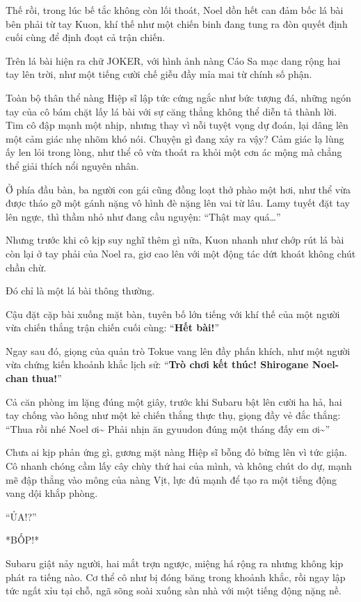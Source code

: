 \documentclass[../main.tex]{subfiles}
\begin{document}
\label{cardleft}

Thế rồi, trong lúc bế tắc không còn lối thoát, Noel dồn hết can đảm bốc lá bài bên phải từ tay Kuon, khí thế như một chiến binh đang tung ra đòn quyết định cuối cùng để định đoạt cả trận chiến.

Trên lá bài hiện ra chữ JOKER, với hình ảnh nàng Cáo Sa mạc dang rộng hai tay lên trời, như một tiếng cười chế giễu đầy mỉa mai từ chính số phận.

Toàn bộ thân thể nàng Hiệp sĩ lập tức cứng ngắc như bức tượng đá, những ngón tay của cô bám chặt lấy lá bài với sự căng thẳng không thể diễn tả thành lời. Tim cô đập mạnh một nhịp, nhưng thay vì nỗi tuyệt vọng dự đoán, lại dâng lên một cảm giác nhẹ nhõm khó nói. Chuyện gì đang xảy ra vậy? Cảm giác lạ lùng ấy len lỏi trong lòng, như thể cô vừa thoát ra khỏi một cơn ác mộng mà chẳng thể giải thích nổi nguyên nhân.

Ở phía đầu bàn, ba người con gái cũng đồng loạt thở phào một hơi, như thể vừa được tháo gỡ một gánh nặng vô hình đè nặng lên vai từ lâu. Lamy tuyết đặt tay lên ngực, thì thầm nhỏ như đang cầu nguyện: ``Thật may quá\dots''

Nhưng trước khi cô kịp suy nghĩ thêm gì nữa, Kuon nhanh như chớp rút lá bài còn lại ở tay phải của Noel ra, giơ cao lên với một động tác dứt khoát không chút chần chừ.

Đó chỉ là một lá bài thông thường.

Cậu đặt cặp bài xuống mặt bàn, tuyên bố lớn tiếng với khí thế của một người vừa chiến thắng trận chiến cuối cùng: ``\textbf{Hết bài!}''

Ngay sau đó, giọng của quản trò Tokue vang lên đầy phấn khích, như một người vừa chứng kiến khoảnh khắc lịch sử: ``\textbf{Trò chơi kết thúc! Shirogane Noel-chan thua!}''

Cả căn phòng im lặng đúng một giây, trước khi Subaru bật lên cười ha hả, hai tay chống vào hông như một kẻ chiến thắng thực thụ, giọng đầy vẻ đắc thắng: ``Thua rồi nhé Noel ơi\~{} Phải nhịn ăn gyuudon đúng một tháng đấy em ơi\~{}''

Chưa ai kịp phản ứng gì, gương mặt nàng Hiệp sĩ bỗng đỏ bừng lên vì tức giận. Cô nhanh chóng cầm lấy cây chùy thứ hai của mình, và không chút do dự, mạnh mẽ đập thẳng vào mông của nàng Vịt, lực đủ mạnh để tạo ra một tiếng động vang dội khắp phòng.

``ỦA!?''

*BỐP!*

Subaru giật nảy người, hai mắt trợn ngược, miệng há rộng ra nhưng không kịp phát ra tiếng nào. Cơ thể cô như bị đóng băng trong khoảnh khắc, rồi ngay lập tức ngất xỉu tại chỗ, ngã sõng soài xuống sàn nhà với một tiếng động nặng nề.
\end{document}
